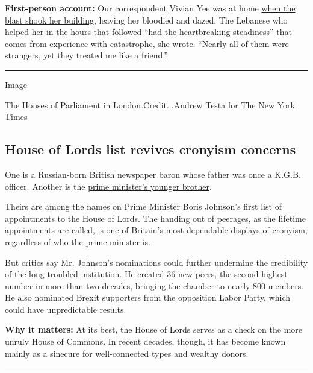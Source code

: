 \textbf{First-person account:} Our correspondent Vivian Yee was at home
\href{https://www.nytimes.com/2020/08/04/world/middleeast/lebanon-explosion-beirut.html}{when
the blast shook her building}, leaving her bloodied and dazed. The
Lebanese who helped her in the hours that followed ``had the
heartbreaking steadiness'' that comes from experience with catastrophe,
she wrote. ``Nearly all of them were strangers, yet they treated me like
a friend.''

\begin{center}\rule{0.5\linewidth}{\linethickness}\end{center}

Image

The Houses of Parliament in London.Credit...Andrew Testa for The New
York Times

\hypertarget{house-of-lords-list-revives-cronyism-concerns}{%
\subsection{House of Lords list revives cronyism
concerns}\label{house-of-lords-list-revives-cronyism-concerns}}

One is a Russian-born British newspaper baron whose father was once a
K.G.B. officer. Another is the
\href{https://www.nytimes.com/2020/08/04/world/house-of-lords-boris-johnson.html}{prime
minister's younger brother}.

Theirs are among the names on Prime Minister Boris Johnson's first list
of appointments to the House of Lords. The handing out of peerages, as
the lifetime appointments are called, is one of Britain's most
dependable displays of cronyism, regardless of who the prime minister
is.

But critics say Mr. Johnson's nominations could further undermine the
credibility of the long-troubled institution. He created 36 new peers,
the second-highest number in more than two decades, bringing the chamber
to nearly 800 members. He also nominated Brexit supporters from the
opposition Labor Party, which could have unpredictable results.

\textbf{Why it matters:} At its best, the House of Lords serves as a
check on the more unruly House of Commons. In recent decades, though, it
has become known mainly as a sinecure for well-connected types and
wealthy donors.

\begin{center}\rule{0.5\linewidth}{\linethickness}\end{center}

